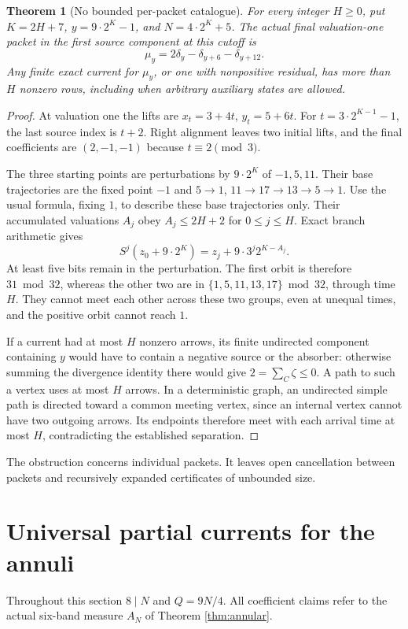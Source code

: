 \documentclass[11pt]{article}
\newtheorem{theorem}{Theorem}
\begin{document}
\begin{theorem}[No bounded per-packet catalogue]
For every integer $H\ge0$, put $K=2H+7$, $y=9\cdot2^K-1$, and
$N=4\cdot2^K+5$. The actual final valuation-one packet in the first
source component at this cutoff is
\[
\mu_y=2\delta_y-\delta_{y+6}-\delta_{y+12}.
\]
Any finite exact current for $\mu_y$, or one with nonpositive residual,
has more than $H$ nonzero rows, including when arbitrary auxiliary states
are allowed.
\end{theorem}
\begin{proof}
At valuation one the lifts are $x_t=3+4t$, $y_t=5+6t$.
For $t=3\cdot2^{K-1}-1$, the last source index is $t+2$.
Right alignment leaves two initial lifts, and the final coefficients are
$(2,-1,-1)$ because $t\equiv2\pmod3$.

The three starting points are perturbations by $9\cdot2^K$ of $-1,5,11$.
Their base trajectories are the fixed point $-1$ and
$5\to1$, $11\to17\to13\to5\to1$. Use the usual formula, fixing $1$,
to describe these base trajectories only. Their accumulated valuations
$A_j$ obey $A_j\le2H+2$ for $0\le j\le H$. Exact branch arithmetic gives
\[
S^j(z_0+9\cdot2^K)=z_j+9\cdot3^j2^{K-A_j}.
\]
At least five bits remain in the perturbation. The first orbit is therefore
$31\bmod32$, whereas the other two are in $\{1,5,11,13,17\}\bmod32$,
through time $H$. They cannot meet each other across these two groups,
even at unequal times, and the positive orbit cannot reach $1$.

If a current had at most $H$ nonzero arrows, its finite undirected component
containing $y$ would have to contain a negative source or the absorber:
otherwise summing the divergence identity there would give
$2=\sum_C\zeta\le0$. A path to such a vertex uses at most $H$ arrows.
In a deterministic graph, an undirected simple path is directed toward a
common meeting vertex, since an internal vertex cannot have two outgoing
arrows. Its endpoints therefore meet with each arrival time at most $H$,
contradicting the established separation.
\end{proof}
The obstruction concerns individual packets. It leaves open cancellation
between packets and recursively expanded certificates of unbounded size.

\section{Universal partial currents for the annuli}
Throughout this section $8\mid N$ and $Q=9N/4$. All coefficient claims
refer to the actual six-band measure $A_N$ of Theorem \ref{thm:annular}.
\end{document}
